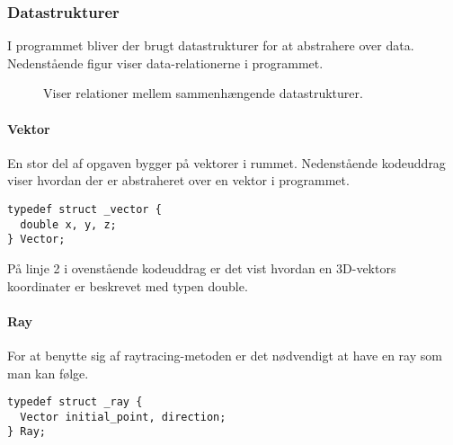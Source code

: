 \subsubsection{Datastrukturer}
I programmet bliver der brugt datastrukturer for at abstrahere over data. Nedenstående figur viser data-relationerne i programmet.

\begin{figure}[H]
\centering
{}
\caption{Viser relationer mellem sammenhængende datastrukturer.}
\label{fig:data_model}
\end{figure}

\paragraph{Vektor}
En stor del af opgaven bygger på vektorer i rummet. Nedenstående kodeuddrag viser hvordan der er abstraheret over en vektor i programmet. 

\begin{lstlisting}[style=Cstyle, caption=Struct til vektor]
typedef struct _vector {
  double x, y, z;
} Vector;
\end{lstlisting}

På linje 2 i ovenstående kodeuddrag er det vist hvordan en 3D-vektors koordinater er beskrevet med typen double. 

\paragraph{Ray}
For at benytte sig af raytracing-metoden er det nødvendigt at have en ray som man kan følge. 

\begin{lstlisting}[style=Cstyle, caption=Struct til ray]
typedef struct _ray {
  Vector initial_point, direction;
} Ray;
\end{lstlisting}

